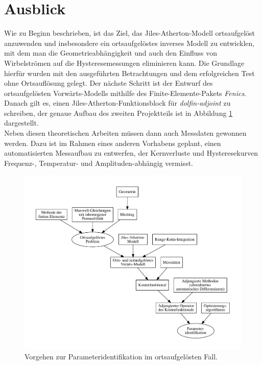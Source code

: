\documentclass{scrartcl}
\begin{document}
\section{Ausblick}
Wie zu Beginn beschrieben, ist das Ziel, das Jiles-Atherton-Modell ortsaufgelöst anzuwenden und insbesondere ein ortsaufgelöstes inverses Modell zu entwicklen, mit dem man die Geometrieabhängigkeit und auch den Einfluss von Wirbelströmen auf die Hysteresemessungen eliminieren kann. Die Grundlage hierfür wurden mit den ausgeführten Betrachtungen und dem erfolgreichen Test ohne Ortsauflösung gelegt. Der nächste Schritt ist der Entwurf des ortsaufgelösten Vorwärts-Modells mithilfe des Finite-Elemente-Pakets \emph{Fenics}. Danach gilt es, einen Jiles-Atherton-Funktionsblock für \emph{dolfin-adjoint} zu schreiben, der genaue Aufbau des zweiten Projektteils ist in Abbildung \ref{fig:vorgehen_ort} dargestellt.\\
Neben diesen theoretischen Arbeiten müssen dann auch Messdaten gewonnen werden. Dazu ist im Rahmen eines anderen Vorhabens geplant, einen automatisierten Messaufbau zu entwerfen, der Kernverluste und Hysteresekurven Frequenz-, Temperatur- und Amplituden-abhängig vermisst.
\begin{figure}
\caption{Vorgehen zur Parameteridentifikation im ortsaufgelösten Fall.}
\label{fig:vorgehen_ort}

\includegraphics[width=\textwidth]{vorgehen_ort.pdf}

\end{figure}
\newpage
\end{document}
